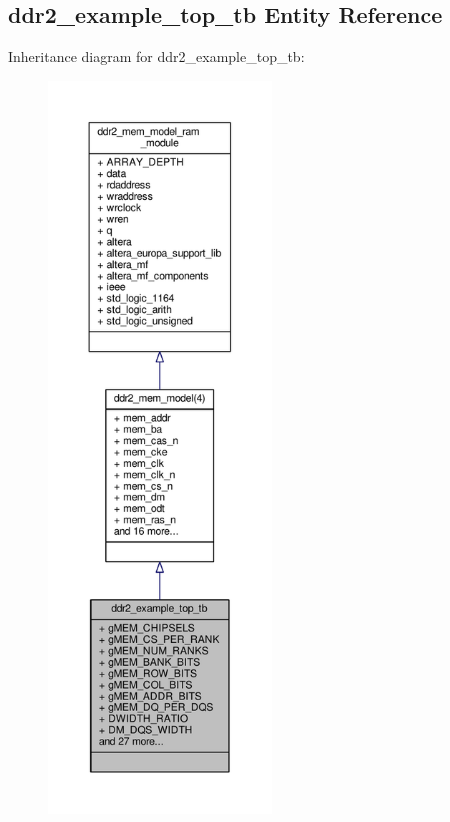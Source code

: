 \subsection{ddr2\+\_\+example\+\_\+top\+\_\+tb Entity Reference}
\label{classddr2__example__top__tb}


Inheritance diagram for ddr2\+\_\+example\+\_\+top\+\_\+tb\+:\nopagebreak
\begin{figure}[H]
\begin{center}
\leavevmode
\includegraphics[height=550pt]{d9/dff/classddr2__example__top__tb__inherit__graph}
\end{center}
\end{figure}



